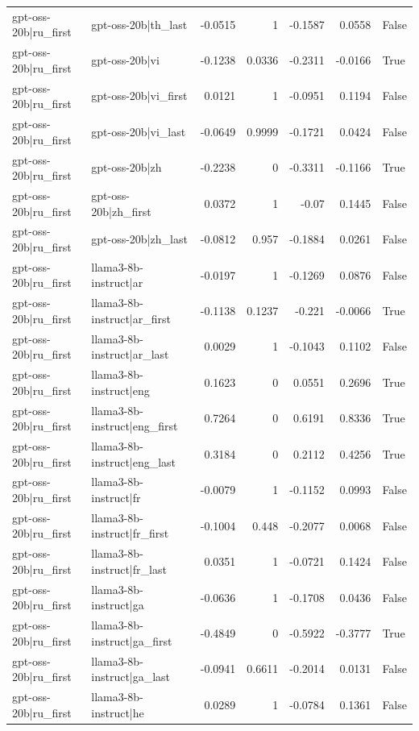 \begin{table}
\begin{tabular}{l l r r r r l}
gpt-oss-20b|ru_first & gpt-oss-20b|th_last & -0.0515 & 1 & -0.1587 & 0.0558 & False \\
gpt-oss-20b|ru_first & gpt-oss-20b|vi & -0.1238 & 0.0336 & -0.2311 & -0.0166 & True \\
gpt-oss-20b|ru_first & gpt-oss-20b|vi_first & 0.0121 & 1 & -0.0951 & 0.1194 & False \\
gpt-oss-20b|ru_first & gpt-oss-20b|vi_last & -0.0649 & 0.9999 & -0.1721 & 0.0424 & False \\
gpt-oss-20b|ru_first & gpt-oss-20b|zh & -0.2238 & 0 & -0.3311 & -0.1166 & True \\
gpt-oss-20b|ru_first & gpt-oss-20b|zh_first & 0.0372 & 1 & -0.07 & 0.1445 & False \\
gpt-oss-20b|ru_first & gpt-oss-20b|zh_last & -0.0812 & 0.957 & -0.1884 & 0.0261 & False \\
gpt-oss-20b|ru_first & llama3-8b-instruct|ar & -0.0197 & 1 & -0.1269 & 0.0876 & False \\
gpt-oss-20b|ru_first & llama3-8b-instruct|ar_first & -0.1138 & 0.1237 & -0.221 & -0.0066 & True \\
gpt-oss-20b|ru_first & llama3-8b-instruct|ar_last & 0.0029 & 1 & -0.1043 & 0.1102 & False \\
gpt-oss-20b|ru_first & llama3-8b-instruct|eng & 0.1623 & 0 & 0.0551 & 0.2696 & True \\
gpt-oss-20b|ru_first & llama3-8b-instruct|eng_first & 0.7264 & 0 & 0.6191 & 0.8336 & True \\
gpt-oss-20b|ru_first & llama3-8b-instruct|eng_last & 0.3184 & 0 & 0.2112 & 0.4256 & True \\
gpt-oss-20b|ru_first & llama3-8b-instruct|fr & -0.0079 & 1 & -0.1152 & 0.0993 & False \\
gpt-oss-20b|ru_first & llama3-8b-instruct|fr_first & -0.1004 & 0.448 & -0.2077 & 0.0068 & False \\
gpt-oss-20b|ru_first & llama3-8b-instruct|fr_last & 0.0351 & 1 & -0.0721 & 0.1424 & False \\
gpt-oss-20b|ru_first & llama3-8b-instruct|ga & -0.0636 & 1 & -0.1708 & 0.0436 & False \\
gpt-oss-20b|ru_first & llama3-8b-instruct|ga_first & -0.4849 & 0 & -0.5922 & -0.3777 & True \\
gpt-oss-20b|ru_first & llama3-8b-instruct|ga_last & -0.0941 & 0.6611 & -0.2014 & 0.0131 & False \\
gpt-oss-20b|ru_first & llama3-8b-instruct|he & 0.0289 & 1 & -0.0784 & 0.1361 & False \\

\end{tabular}
\end{table}
